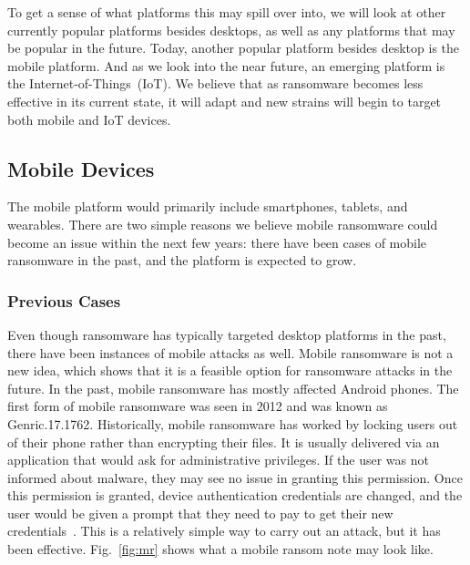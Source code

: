 \documentclass{IEEEtran}
\begin{document}
To get a sense of what platforms this may spill over into, we will look at other currently popular platforms besides desktops, as well as any platforms that may be popular in the future. Today, another popular platform besides desktop is the mobile platform. And as we look into the near future, an emerging platform is the Internet-of-Things~(IoT). We believe that as ransomware becomes less effective in its current state, it will adapt and new strains will begin to target both mobile and IoT devices.

\subsection{Mobile Devices}\label{mobile}
The mobile platform would primarily include smartphones, tablets, and wearables. There are two simple reasons we believe mobile ransomware could become an issue within the next few years: there have been cases of mobile ransomware in the past, and the platform is expected to grow.
\hfill \break

\subsubsection{Previous Cases}
Even though ransomware has typically targeted desktop platforms in the past, there have been instances of mobile attacks as well. Mobile ransomware is not a new idea, which shows that it is a feasible option for ransomware attacks in the future. In the past, mobile ransomware has mostly affected Android phones. The first form of mobile ransomware was seen in 2012 and was known as Genric.17.1762. Historically, mobile ransomware has worked by locking users out of their phone rather than encrypting their files. It is usually delivered via an application that would ask for administrative privileges. If the user was not informed about malware, they may see no issue in granting this permission. Once this permission is granted, device authentication credentials are changed, and the user would be given a prompt that they need to pay to get their new credentials~\cite{RN13}. This is a relatively simple way to carry out an attack, but it has been effective. Fig.~\ref{fig:mr} shows what a mobile ransom note may look like. 
\end{document}
